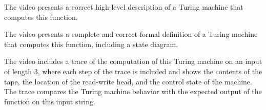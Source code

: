 The video presents a correct high-level description of a Turing machine that computes this function.

The video presents a complete and correct formal definition of a Turing machine that computes this function,
including a state diagram.

The video includes a trace of the computation of this Turing machine on an input of length $3$, where
each step of the trace is included and shows the contents of the tape, the location of the read-write head, and 
the control state of the machine. The trace compares the Turing machine behavior with the expected output
of the function on this input string.

\newpage

